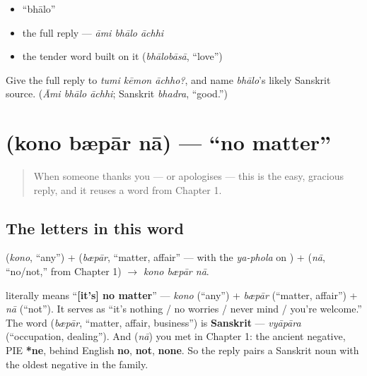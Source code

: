 \begin{itemize}
\raggedright
  \item \textquotedblleft{}bhālo\textquotedblright{}
  \item the full reply — \emph{āmi bhālo āchhi}
  \item the tender word built on it (\emph{bhālobāsā}, \textquotedblleft{}love\textquotedblright{})
\end{itemize}

\begin{tcolorbox}[breakable,colback=teal!4,colframe=teal!35!black,title={Before you move on}]
Give the full reply to \emph{tumi kēmon āchho?}, and name \emph{bhālo}'s likely Sanskrit source. (\emph{Āmi bhālo āchhi}; Sanskrit \emph{bhadra}, \textquotedblleft{}good.\textquotedblright{})
\end{tcolorbox}
\section[\bn{কোনো} \bn{ব্যাপার} \bn{না}]{   (kono bæpār nā) — \textquotedblleft{}no matter\textquotedblright{}}

\label{lesson:BN-C03-kono-bepar-na}



\begin{quote}
When someone thanks you — or apologises — this is the easy, gracious reply, and it reuses a word from Chapter 1.
\end{quote}

\subsection*{The letters in this word}
\textbf{} (\emph{kono}, \textquotedblleft{}any\textquotedblright{}) + \textbf{} (\emph{bæpār}, \textquotedblleft{}matter, affair\textquotedblright{} — with the \emph{ya-phola} on \textbf{}) + \textbf{} (\emph{nā}, \textquotedblleft{}no/not,\textquotedblright{} from Chapter 1) $\to$ \emph{kono bæpār nā}.

\begin{cousinweb}
\textbf{  } literally means \textquotedblleft{}\textbf{{[}it's{]} no matter}\textquotedblright{} — \emph{kono} (\textquotedblleft{}any\textquotedblright{}) + \emph{bæpār} (\textquotedblleft{}matter, affair\textquotedblright{}) + \emph{nā} (\textquotedblleft{}not\textquotedblright{}). It serves as \textquotedblleft{}it's nothing / no worries / never mind / you're welcome.\textquotedblright{} The word \textbf{} (\emph{bæpār}, \textquotedblleft{}matter, affair, business\textquotedblright{}) is \textbf{Sanskrit} — \emph{vyāpāra} (\textquotedblleft{}occupation, dealing\textquotedblright{}). And \textbf{} (\emph{nā}) you met in Chapter 1: the ancient negative, PIE \textbf{*ne}, behind English \textbf{no}, \textbf{not}, \textbf{none}. So the reply pairs a Sanskrit noun with the oldest negative in the family.
\end{cousinweb}

